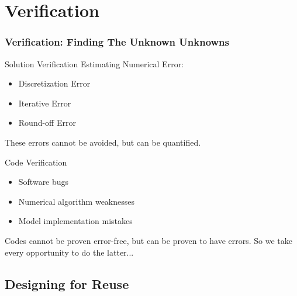 \section{Verification}

\begin{frame}
\frametitle{Verification: Finding The Unknown Unknowns}
\begin{block}{Solution Verification}
Estimating Numerical Error:
\begin{itemize}
\item Discretization Error
\item Iterative Error
\item Round-off Error
\end{itemize}
These errors cannot be avoided, but can be quantified.
\end{block}
\begin{block}{Code Verification}
\begin{itemize}
\item Software bugs
\item Numerical algorithm weaknesses
\item Model implementation mistakes
\end{itemize}
Codes cannot be proven error-free, but can be proven to
have errors.  So we take every opportunity to do the latter...

\end{block}

\end{frame}


\subsection{Designing for Reuse}

